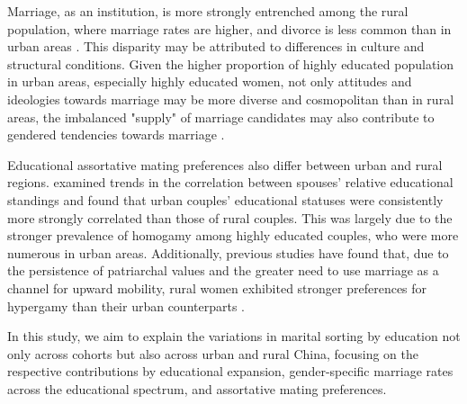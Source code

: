 Marriage, as an institution, is more strongly entrenched among the rural population, where marriage rates are higher, and divorce is less common than in urban areas \parencite{luoChineseTrendsAdolescent2020}. This disparity may be attributed to differences in culture and structural conditions. Given the higher proportion of highly educated population in urban areas, especially highly educated women, not only attitudes and ideologies towards marriage may be more diverse and cosmopolitan than in rural areas, the imbalanced "supply" of marriage candidates may also contribute to gendered tendencies towards marriage \parencite{huGenderEducationExpansion2023}.

Educational assortative mating preferences also differ between urban and rural regions. \textcite{duTrendsEducationalAssortative2023} examined trends in the correlation between spouses' relative educational standings and found that urban couples' educational statuses were consistently more strongly correlated than those of rural couples. This was largely due to the stronger prevalence of homogamy among highly educated couples, who were more numerous in urban areas. Additionally, previous studies have found that, due to the persistence of patriarchal values and the greater need to use marriage as a channel for upward mobility, rural women exhibited stronger preferences for hypergamy than their urban counterparts \parencite{weiUnderstandingHypergamousMarriages2016}.

In this study, we aim to explain the variations in marital sorting by education not only across cohorts but also across urban and rural China, focusing on the respective contributions by educational expansion, gender-specific marriage rates across the educational spectrum, and assortative mating preferences.

